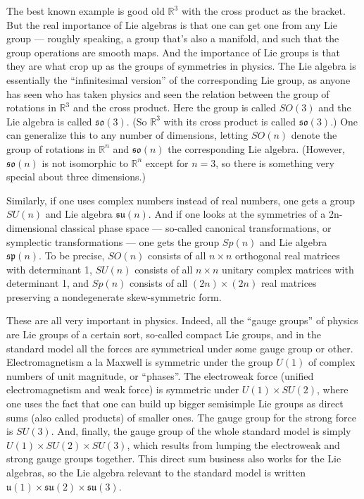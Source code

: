 \documentclass{article}
\begin{document}
The best known example is good old \(\mathbb{R}^3\) with the cross
product as the bracket. But the real importance of Lie algebras is that
one can get one from any Lie group --- roughly speaking, a group that's
also a manifold, and such that the group operations are smooth maps. And
the importance of Lie groups is that they are what crop up as the groups
of symmetries in physics. The Lie algebra is essentially the
``infinitesimal version'' of the corresponding Lie group, as anyone has
seen who has taken physics and seen the relation between the group of
rotations in \(\mathbb{R}^3\) and the cross product. Here the group is
called \(SO(3)\) and the Lie algebra is called \(\mathfrak{so}(3)\). (So
\(\mathbb{R}^3\) with its cross product is called \(\mathfrak{so}(3)\).)
One can generalize this to any number of dimensions, letting \(SO(n)\)
denote the group of rotations in \(\mathbb{R}^n\) and
\(\mathfrak{so}(n)\) the corresponding Lie algebra. (However,
\(\mathfrak{so}(n)\) is not isomorphic to \(\mathbb{R}^n\) except for
\(n = 3\), so there is something very special about three dimensions.)

Similarly, if one uses complex numbers instead of real numbers, one gets
a group \(SU(n)\) and Lie algebra \(\mathfrak{su}(n)\). And if one looks
at the symmetries of a 2n-dimensional classical phase space ---
so-called canonical transformations, or symplectic transformations ---
one gets the group \(Sp(n)\) and Lie algebra \(\mathfrak{sp}(n)\). To be
precise, \(SO(n)\) consists of all \(n\times n\) orthogonal real
matrices with determinant 1, \(SU(n)\) consists of all \(n\times n\)
unitary complex matrices with determinant 1, and \(Sp(n)\) consists of
all \((2n)\times(2n)\) real matrices preserving a nondegenerate
skew-symmetric form.

These are all very important in physics. Indeed, all the ``gauge
groups'' of physics are Lie groups of a certain sort, so-called compact
Lie groups, and in the standard model all the forces are symmetrical
under some gauge group or other. Electromagnetism a la Maxwell is
symmetric under the group \(U(1)\) of complex numbers of unit magnitude,
or ``phases''. The electroweak force (unified electromagnetism and weak
force) is symmetric under \(U(1) \times SU(2)\), where one uses the fact
that one can build up bigger semisimple Lie groups as direct sums (also
called products) of smaller ones. The gauge group for the strong force
is \(SU(3)\). And, finally, the gauge group of the whole standard model
is simply \(U(1) \times SU(2) \times SU(3)\), which results from lumping
the electroweak and strong gauge groups together. This direct sum
business also works for the Lie algebras, so the Lie algebra relevant to
the standard model is written
\(\mathfrak{u}(1) \times \mathfrak{su}(2) \times \mathfrak{su}(3)\).
\end{document}
